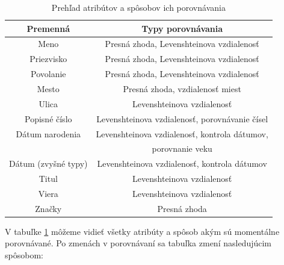 \begin {table}[ht]
\begin{center}
\begin{tabular}{ |c|c|} 
\hline
Premenná               & Typy porovnávania \\
\hline
 Meno                  & Presná zhoda, Levenshteinova vzdialenosť      \\
 Priezvisko            & Presná zhoda, Levenshteinova vzdialenosť      \\
 Povolanie             & Presná zhoda, Levenshteinova vzdialenosť      \\
 Mesto                  & Presná zhoda, vzdialenosť miest    \\
 Ulica                 & Levenshteinova vzdialenosť\\
 Popisné číslo         & Levenshteinova vzdialenosť, porovnávanie čísel  \\
 Dátum narodenia       & Levenshteinova vzdialenosť, kontrola dátumov,\\
                                     &  porovnanie veku\\
 Dátum (zvyšné typy)   & Levenshteinova vzdialenosť, kontrola dátumov \\
 Titul                 & Levenshteinova vzdialenosť \\
 Viera                 & Levenshteinova vzdialenosť \\
 Značky                & Presná zhoda   \\
\hline
\end{tabular}
\caption {Prehľad atribútov a spôsobov ich porovnávania} \label{porovavanie}
\end{center}
\end {table}

V tabuľke \ref{porovavanie} môžeme vidieť všetky atribúty a spôsob akým sú momentálne porovnávané. Po
zmenách v porovnávaní sa tabuľka zmení nasledujúcim spôsobom:

